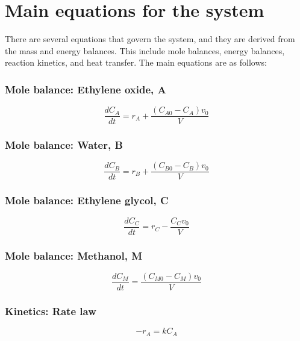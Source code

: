 \section{Main equations for the system}

There are several equations that govern the system, and they are derived from the mass and energy balances. This include mole balances, energy balances, reaction kinetics, and heat transfer. The main equations are as follows:

\subsubsection*{Mole balance: Ethylene oxide, A}
\begin{equation}
    \frac{dC_A}{dt}
    =
    r_A
    +
    \frac{(C_{A0}-C_A)v_0}{V}
    \label{eq:mole_balance_A}
\end{equation}

\subsubsection*{Mole balance: Water, B}
\begin{equation}
    \frac{dC_B}{dt}
    =
    r_B
    +
    \frac{(C_{B0}-C_B)v_0}{V}
    \label{eq:mole_balance_B}
\end{equation}

\subsubsection*{Mole balance: Ethylene glycol, C}
\begin{equation}
    \frac{dC_C}{dt}
    =
    r_C
    -
    \frac{C_C v_0}{V}
    \label{eq:mole_balance_C}
\end{equation}

\subsubsection*{Mole balance: Methanol, M}
\begin{equation}
    \frac{dC_M}{dt}
    =
    \frac{(C_{M0}-C_M)v_0}{V}
    \label{eq:mole_balance_M}
\end{equation}

\subsubsection*{Kinetics: Rate law}
\begin{equation}
    -r_A
    =
    k C_A
    \label{eq:rate_law}
\end{equation}

